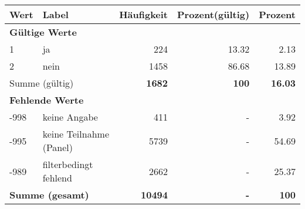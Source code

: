      \begin{longtable}{lXrrr}
     \toprule
     \textbf{Wert} & \textbf{Label} & \textbf{Häufigkeit} & \textbf{Prozent(gültig)} & \textbf{Prozent} \\
     \endhead
     \midrule
     \multicolumn{5}{l}{\textbf{Gültige Werte}}\\

     1 &
     \multicolumn{1}{X}{ ja   } &


       \num{224} &
       \num[round-mode=places,round-precision=2]{13.32} &
         \num[round-mode=places,round-precision=2]{2.13} \\

     2 &
     \multicolumn{1}{X}{ nein   } &


       \num{1458} &
       \num[round-mode=places,round-precision=2]{86.68} &
         \num[round-mode=places,round-precision=2]{13.89} \\
     \midrule
     \multicolumn{2}{l}{Summe (gültig)} &
       \textbf{\num{1682}} &
     \textbf{\num{100}} &
       \textbf{\num[round-mode=places,round-precision=2]{16.03}} \\
     \multicolumn{5}{l}{\textbf{Fehlende Werte}}\\
       -998 &
       keine Angabe &
         \num{411} &
        - &
         \num[round-mode=places,round-precision=2]{3.92} \\
       -995 &
       keine Teilnahme (Panel) &
         \num{5739} &
        - &
         \num[round-mode=places,round-precision=2]{54.69} \\
       -989 &
       filterbedingt fehlend &
         \num{2662} &
        - &
         \num[round-mode=places,round-precision=2]{25.37} \\
     \midrule
     \multicolumn{2}{l}{\textbf{Summe (gesamt)}} &
          \textbf{\num{10494}} &
        \textbf{-} &
        \textbf{\num{100}} \\
     \bottomrule
     \end{longtable}
     
